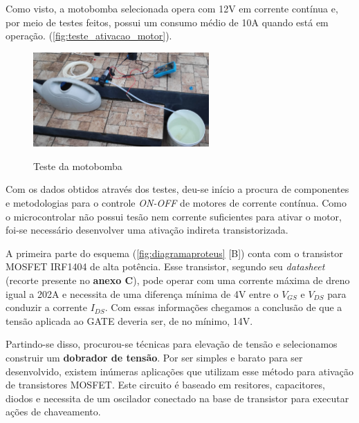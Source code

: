  Como visto, a motobomba selecionada opera com 12V em corrente contínua e, por meio de testes feitos, possui um consumo médio de 10A quando está em operação. (\autoref{fig:teste_ativacao_motor}).
 
  \begin{figure}[H]
 	\centering
 	\caption{Teste da motobomba}
 	\includegraphics[width=0.6\textwidth]{figuras/teste_motor.jpg}
 	\label{fig:teste_ativacao_motor}
 \end{figure}

Com os dados obtidos através dos testes, deu-se início a procura de componentes e metodologias para o controle \textit{ON-OFF} de motores de corrente contínua. Como o microcontrolar não possui tesão nem corrente suficientes para ativar o motor, foi-se necessário desenvolver uma ativação indireta transistorizada.  

A primeira parte do esquema (\autoref{fig:diagramaproteus} [B]) conta com o transistor MOSFET  IRF1404 de alta potência. Esse transistor, segundo seu \textit{datasheet} (recorte presente no \textbf{anexo C}), pode operar com uma corrente máxima de dreno igual a 202A e necessita de uma diferença mínima de 4V entre o $V_{GS}$ e $V_{DS}$ para conduzir a corrente $I_{DS}$.
Com essas informações chegamos a conclusão de que a tensão aplicada ao GATE deveria ser, de no mínimo, 14V.

Partindo-se disso, procurou-se técnicas para elevação de tensão e selecionamos construir um \textbf{dobrador de tensão}. Por ser simples e barato para ser desenvolvido, existem inúmeras aplicações que utilizam esse método para ativação de transistores MOSFET. Este circuito é baseado em resitores, capacitores, diodos e necessita de um oscilador conectado na base de transistor para executar ações de chaveamento. 

